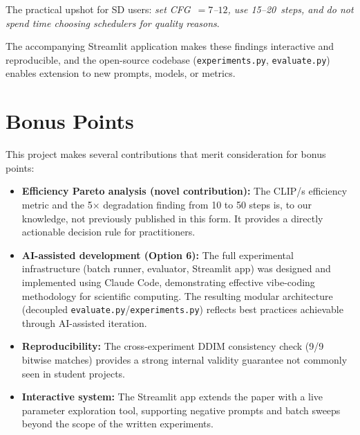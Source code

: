 \documentclass{article}
\begin{document}
The practical upshot for SD users: \emph{set CFG~$= 7$--$12$, use 15--20~steps,
and do not spend time choosing schedulers for quality reasons}.

The accompanying Streamlit application makes these findings interactive and
reproducible, and the open-source codebase (\texttt{experiments.py},
\texttt{evaluate.py}) enables extension to new prompts, models, or metrics.

\section*{Bonus Points}
This project makes several contributions that merit consideration for bonus points:

\begin{itemize}
\item \textbf{Efficiency Pareto analysis (novel contribution):}
  The CLIP/s efficiency metric and the 5$\times$ degradation finding from
  10 to 50 steps is, to our knowledge, not previously published in this form.
  It provides a directly actionable decision rule for practitioners.
\item \textbf{AI-assisted development (Option 6):}
  The full experimental infrastructure (batch runner, evaluator, Streamlit app)
  was designed and implemented using Claude Code, demonstrating effective
  vibe-coding methodology for scientific computing.
  The resulting modular architecture (decoupled \texttt{evaluate.py}/\texttt{experiments.py})
  reflects best practices achievable through AI-assisted iteration.
\item \textbf{Reproducibility:} The cross-experiment DDIM consistency check
  (9/9 bitwise matches) provides a strong internal validity guarantee not commonly
  seen in student projects.
\item \textbf{Interactive system:} The Streamlit app extends the paper with
  a live parameter exploration tool, supporting negative prompts and batch sweeps
  beyond the scope of the written experiments.
\end{itemize}



\end{document}
